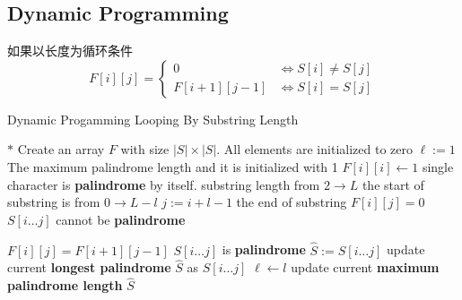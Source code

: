 \subsection{Dynamic Programming}
如果以长度为循环条件
\[
F[i][j]  = 
\begin{cases}
0 & \iff S[i] \neq S[j] \\
F[i+1][j-1] &\iff S[i] = S[j]
\end{cases}
\]
\setcounter{algorithm}{0}
\begin{algorithm}[H]
	\caption{Dynamic Progamming Looping By Substring Length}
	\begin{algorithmic}[1]
		\State $\ast$ Create an array $F$ with size $|S|\times|S|$. All elements are initialized to zero
		\State $\ell := 1$ \Comment The maximum palindrome length and it is initialized with 1
		\State $F[i][i] \gets 1$ \Comment single character is \textbf{palindrome} by itself.
		\EndFor
				 \Comment substring length from $2 \to L$
		 \Comment the start of substring is from $0 \to L - l$
		\State $j := i + l - 1$ \Comment the end of substring
		\State $F[i][j] = 0$ \Comment $S[i\ldots j]$ cannot be \textbf{palindrome}
\end{algorithmic}
\end{algorithm}
\begin{algorithm}[H]
\begin{algorithmic}[1]
		\Else
		\State $F[i][j] = F[i+1][j-1]$ 
		\EndIf
		 \Comment $S[i\ldots j]$ is \textbf{palindrome}
		\State $\hat{S} := S[i\ldots j]$ \Comment update current \textbf{longest palindrome} $\hat{S}$ as $S[i\ldots j]$
		\State $\ell \gets l$ \Comment update current \textbf{maximum palindrome length}
		\EndIf
		\EndIf
		\EndFor
		\EndFor
		\State \Return $\hat{S}$
		\EndProcedure
	\end{algorithmic}
\end{algorithm}
